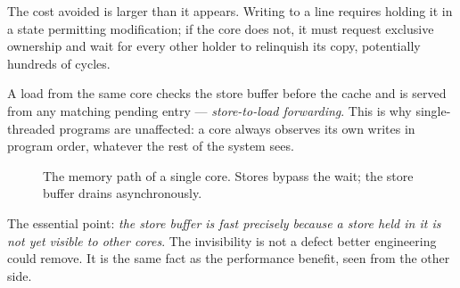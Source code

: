 The cost avoided is larger than it appears.
Writing to a line requires holding it in a state permitting modification; if the
core does not, it must request exclusive ownership and wait for every other
holder to relinquish its copy, potentially hundreds of cycles.

A load from the same core checks the store buffer before the cache and is served
from any matching pending entry --- \emph{store-to-load forwarding}.
This is why single-threaded programs are unaffected: a core always observes its
own writes in program order, whatever the rest of the system sees.

\begin{figure}[H]
\centering
{}
\caption{The memory path of a single core. Stores bypass the wait; the store
buffer drains asynchronously.}
\label{fig:d1-hierarchy}
\end{figure}

\noindent The essential point: \emph{the store buffer is fast precisely because
a store held in it is not yet visible to other cores}.
The invisibility is not a defect better engineering could remove.
It is the same fact as the performance benefit, seen from the other side.


